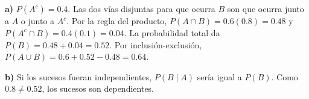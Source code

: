 \textbf{a)} $P(A^c)=0.4$. Las dos vías disjuntas para que ocurra $B$
son que ocurra junto a $A$ o junto a $A^c$. Por la regla del producto,
$P(A\cap B)=0.6(0.8)=\boxed{0.48}$ y $P(A^c\cap B)=0.4(0.1)=0.04$.
La probabilidad total da $P(B)=0.48+0.04=\boxed{0.52}$.
Por inclusión-exclusión,
$P(A\cup B)=0.6+0.52-0.48=\boxed{0.64}$.

\textbf{b)} Si los sucesos fueran independientes,
$P(B\mid A)$ sería igual a $P(B)$. Como $0.8\ne0.52$,
los sucesos son dependientes.
